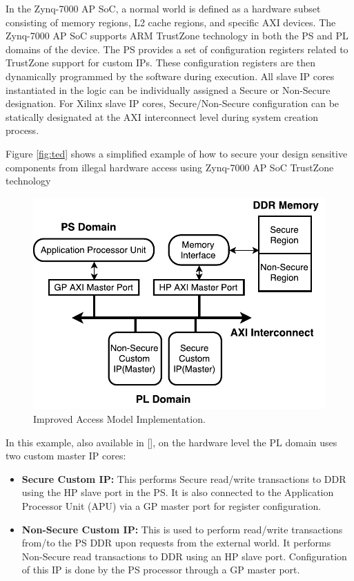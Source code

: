 \documentclass[sigconf]{acmart}
\theoremstyle{plain}
\theoremstyle{remark}
\begin{document}
In the Zynq-7000 AP SoC, a normal world is defined as a hardware subset consisting of memory regions, L2 cache regions, and specific AXI devices. The Zynq-7000 AP SoC supports ARM TrustZone technology in both the PS and PL domains of the device. The PS provides a set of configuration registers related to TrustZone support for custom IPs. These configuration registers are then dynamically programmed by the software during execution. All slave IP cores instantiated in the logic can be individually assigned a Secure or Non-Secure designation. For Xilinx slave IP cores, Secure/Non-Secure configuration can be statically designated at the AXI interconnect level during system creation process.

Figure \ref{fig:ted} shows a simplified example of how to secure your design sensitive components from illegal hardware access using Zynq-7000 AP SoC TrustZone technology

\begin{figure}[hbt]
\centering
\includegraphics[width=1\columnwidth]{figures/TrustZoneHardware.pdf}
\caption{Improved Access Model Implementation.} %
\label{fig:trustzone}
\end{figure}

In this example, also available in [], on the hardware level the PL domain uses two custom master IP cores:

\begin{itemize}
\item \textbf{Secure Custom IP:}
This performs Secure read/write transactions to DDR using the HP slave port in the PS. It is also connected to the Application Processor Unit (APU) via a GP master port for register configuration.
\item \textbf{Non-Secure Custom IP:}
This is used to perform read/write transactions from/to the PS DDR upon requests from the external world. It performs Non-Secure read transactions to DDR using an HP slave port. Configuration of this IP is done by the PS processor through a GP master port.
\end{itemize}
\end{document}
